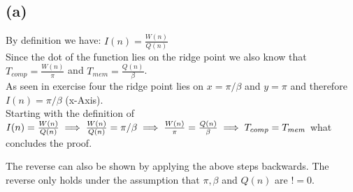 \documentclass[10pt,a4paper,oneside,notitlepage]{report}
\begin{document}
\subsection*{(a)}
By definition we have: 
$I(n)=\frac{W(n)}{Q(n)}$ \\
Since the dot of the function lies on the ridge point we also know that
$T_{comp} = \frac{W(n)}{\pi}$  and
$T_{mem} = \frac{Q(n)}{\beta}$. \\
As seen in exercise four the ridge point lies on $x=\pi/\beta$ and $y=\pi$ and therefore $I(n)=\pi/\beta$ (x-Axis). \\
Starting with the definition of \\
$I(n)=\frac{W(n)}{Q(n)} \\
 \implies \frac{W(n)}{Q(n)} = \pi/\beta \\
  \implies \frac{W(n)}{\pi} = \frac{Q(n)}{\beta}\\
  \implies T_{comp} = T_{mem}$ what concludes the proof.

The reverse can also be shown by applying the above steps backwards. The reverse only holds under the assumption that $\pi, \beta$ and $Q(n)$ are $!=0$.
\end{document}
